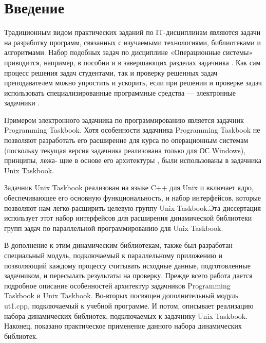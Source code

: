\fixmargins
\makepreliminarypages
\oneandhalfspace
{}
\tableofcontents

\section{Введение}

Традиционным видом практических заданий по IT-дисциплинам являются задачи
на разработку программ, связанных с изучаемыми технологиями, библиотеками
и алгоритмами. Набор подобных задач по дисциплине «Операционные системы» 
приводится, например, в пособии \cite{ref16} и в завершающих разделах задачника \cite{ref17}. 
Как сам процесс решения задач студентами, так и проверку решенных задач 
преподавателем можно упростить и ускорить, если при решении и проверке 
задач использовать специализированные программные средства — электронные 
задачники \cite{ref18}.

Примером электронного задачника по программированию является задачник 
Programming Taskbook. Хотя особенности задачника Programming Taskbook не 
позволяют разработать его расширение для курса по операционным системам 
(поскольку текущая версия задачника реализована только для ОС Windows), 
принципы, лежа- щие в основе его архитектуры \cite{ref19}, были использованы в задачника 
Unix Taskbook.

Задачник Unix Taskbook реализован на языке C++ для Unix и включает ядро, 
обеспечивающее его основную функциональность, и набор интерфейсов, которые 
позволяют нам легко расширить целевую группу Unix Taskbook.Эта диссертация 
использует этот набор интерфейсов для расширения динамической библиотеки групп 
задач по параллельной программированию для Unix Taskbook.

В дополнение к этим динамическим библиотекам, также был разработан специальный 
модуль, подключаемый к параллельному приложению и позволяющий каждому процессу 
считывать исходные данные, подготовленные задачником, и пересылать результаты 
на проверку. Прежде всего работа дается подробное описание особенностей архитектур 
задачников Programming Taskbook и Unix Taskbook. Во-вторых посвящен дополнительный
 модуль ut1.cpp, подключаемый к учебной программе. И потом, описывает реализацию 
 набора динамических библиотек, подключаемых к задачнику Unix Taskbook. Наконец, 
 показано практическое применение данного набора динамических библиотек.


